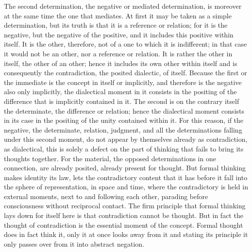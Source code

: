 The second determination, the negative or mediated determination,
is moreover at the same time the one that mediates.
At first it may be taken as a simple determination,
but its truth is that it is a reference or relation;
for it is the negative, but the negative of the positive,
and it includes this positive within itself.
It is the other, therefore, not of a one to which it is indifferent;
in that case it would not be an other, nor a reference or relation.
It is rather the other in itself, the other of an other;
hence it includes its own other within itself
and is consequently the contradiction, the posited dialectic, of itself.
Because the first or the immediate is the concept in itself or implicitly,
and therefore is the negative also only implicitly,
the dialectical moment in it consists in the positing
of the difference that is implicitly contained in it.
The second is on the contrary itself the determinate,
the difference or relation;
hence the dialectical moment consists in its case
in the positing of the unity contained within it.
For this reason, if the negative, the determinate, relation, judgment,
and all the determinations falling under this second moment,
do not appear by themselves already as contradiction,
as dialectical, this is solely a defect on the part
of thinking that fails to bring its thoughts together.
For the material, the opposed determinations in one connection,
are already posited, already present for thought.
But formal thinking makes identity its law,
lets the contradictory content that it has before it
fall into the sphere of representation, in space and time,
where the contradictory is held in external moments,
next to and following each other,
parading before consciousness without reciprocal contact.
The firm principle that formal thinking lays down for itself here
is that contradiction cannot be thought.
But in fact the thought of contradiction is
the essential moment of the concept.
Formal thought does in fact think it,
only it at once looks away from it
and stating its principle it only passes over
from it into abstract negation.

